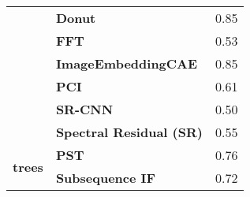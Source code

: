 \begin{table}[h]
\begin{tabular}{llr}
\textbf{} & \textbf{Donut} & 0.85 \\
\textbf{} & \textbf{FFT} & 0.53 \\
\textbf{} & \textbf{ImageEmbeddingCAE} & 0.85 \\
\textbf{} & \textbf{PCI} & 0.61 \\
\textbf{} & \textbf{SR-CNN} & 0.50 \\
\textbf{} & \textbf{Spectral Residual (SR)} & 0.55 \\
\cline{1-3}
\multirow[t]{2}{*}{\textbf{trees}} & \textbf{PST} & 0.76 \\
\textbf{} & \textbf{Subsequence IF} & 0.72 \\
\cline{1-3}
\bottomrule
\end{tabular}
\end{table}
